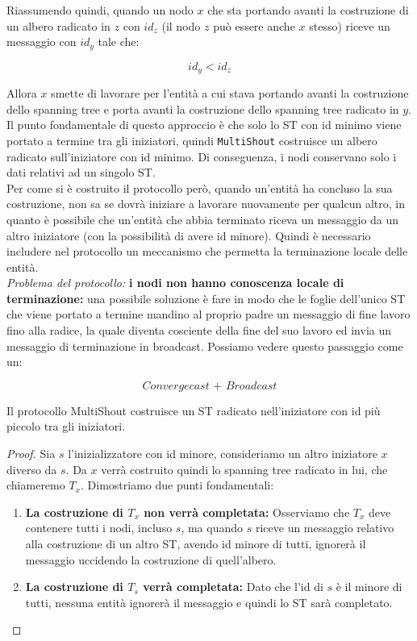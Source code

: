 Riassumendo quindi, quando un nodo $x$ che sta portando avanti la costruzione di
un albero radicato in $z$ con $id_z$ (il nodo $z$ può essere anche $x$ stesso)
riceve un messaggio con $id_y$ tale che:

$$
    id_y < id_z
$$

Allora $x$ smette di lavorare per l'entità a cui stava portando avanti la
costruzione dello spanning tree e porta avanti la costruzione dello spanning
tree radicato in $y$. Il punto fondamentale di questo approccio è che solo lo ST
con id minimo viene portato a termine tra gli iniziatori, quindi
\texttt{MultiShout} costruisce un albero radicato sull'iniziatore con id minimo.
Di conseguenza, i nodi conservano solo i dati relativi ad un singolo ST.\\
Per come si è costruito il protocollo però, quando un'entità ha concluso la sua
costruzione, non sa se dovrà iniziare a lavorare nuovamente per qualcun altro,
in quanto è possibile che un'entità che abbia terminato riceva un messaggio da
un altro iniziatore (con la possibilità di avere id minore). Quindi è necessario
includere nel protocollo un meccanismo che permetta la terminazione locale delle
entità. \\
\textit{Problema del protocollo:} \textbf{i nodi non hanno conoscenza locale di
    terminazione:} una possibile soluzione è fare in modo che le foglie dell'unico
ST che viene portato a termine mandino al proprio padre un messaggio di fine
lavoro fino alla radice, la quale diventa cosciente della fine del suo lavoro ed
invia un messaggio di terminazione in broadcast. Possiamo vedere questo
passaggio come un:

$$
    \textit{Convergecast + Broadcast}
$$

\begin{theorem}
    Il protocollo MultiShout costruisce un ST radicato nell'iniziatore con
    id più piccolo tra gli iniziatori.
\end{theorem}

\begin{proof}
    Sia $s$ l'inizializzatore con id minore, consideriamo un altro iniziatore $x$
    diverso da $s$. Da $x$ verrà costruito quindi lo spanning tree radicato in lui,
    che chiameremo $T_x$. Dimostriamo due punti fondamentali:
    \begin{enumerate}
        \item \textbf{La costruzione di $T_x$ non verrà completata:} Osserviamo
              che $T_x$ deve contenere tutti i nodi, incluso $s$, ma quando $s$
              riceve un messaggio relativo alla costruzione di un altro ST,
              avendo id minore di tutti, ignorerà il messaggio uccidendo la
              costruzione di quell'albero.
        \item \textbf{La costruzione di $T_s$ verrà completata:} Dato che l'id
              di $s$ è il minore di tutti, nessuna entità ignorerà il messaggio
              e quindi lo ST sarà completato.
    \end{enumerate}
\end{proof}

